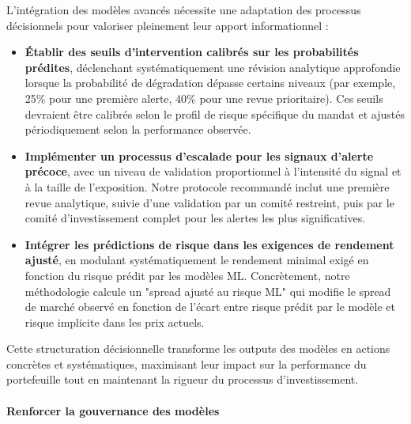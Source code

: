 L'intégration des modèles avancés nécessite une adaptation des processus décisionnels pour valoriser pleinement leur apport informationnel :
\begin{itemize}
    \item \textbf{Établir des seuils d'intervention calibrés sur les probabilités prédites}, déclenchant systématiquement une révision analytique approfondie lorsque la probabilité de dégradation dépasse certains niveaux (par exemple, 25\% pour une première alerte, 40\% pour une revue prioritaire). Ces seuils devraient être calibrés selon le profil de risque spécifique du mandat et ajustés périodiquement selon la performance observée.
    
    \item \textbf{Implémenter un processus d'escalade pour les signaux d'alerte précoce}, avec un niveau de validation proportionnel à l'intensité du signal et à la taille de l'exposition. Notre protocole recommandé inclut une première revue analytique, suivie d'une validation par un comité restreint, puis par le comité d'investissement complet pour les alertes les plus significatives.
    
    \item \textbf{Intégrer les prédictions de risque dans les exigences de rendement ajusté}, en modulant systématiquement le rendement minimal exigé en fonction du risque prédit par les modèles ML. Concrètement, notre méthodologie calcule un "spread ajusté au risque ML" qui modifie le spread de marché observé en fonction de l'écart entre risque prédit par le modèle et risque implicite dans les prix actuels.
\end{itemize}

Cette structuration décisionnelle transforme les outputs des modèles en actions concrètes et systématiques, maximisant leur impact sur la performance du portefeuille tout en maintenant la rigueur du processus d'investissement.

\paragraph{Renforcer la gouvernance des modèles}

